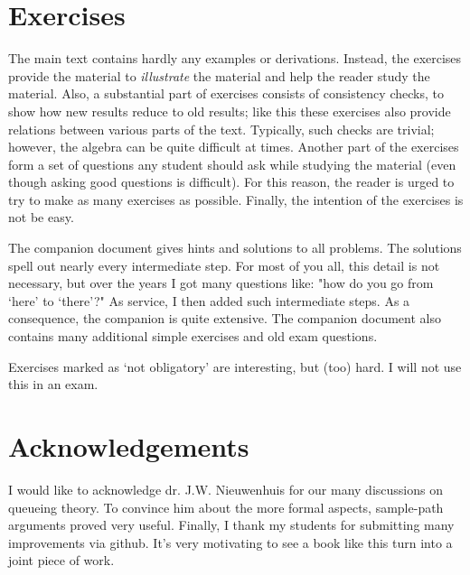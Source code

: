 \section*{Exercises}

The main text contains hardly any examples or derivations.
Instead, the exercises provide the material to \emph{illustrate} the material and help the reader study the material.
Also, a substantial part of exercises consists of consistency checks, to show how new results reduce to old results; like this these exercises also provide relations between various parts of the text.
Typically, such checks are trivial; however, the algebra can be quite difficult at times.
Another part of the exercises form a set of questions any student should ask while studying the material (even though asking good questions is difficult).
For this reason, the reader is urged to try to make as many exercises as possible.
Finally, the intention of  the exercises is not be easy.

The companion document gives hints and solutions to all problems.
The solutions spell out nearly every intermediate step.
For most of you all, this detail is not necessary, but over the years I got many questions like: "how do you go from `here' to `there'?"
As service, I then added such intermediate steps.
As a consequence, the companion is quite extensive.
The companion document also contains many additional simple exercises and old exam questions.

Exercises marked as `not obligatory' are interesting, but (too) hard.
I will not use this in an exam.

\section*{Acknowledgements}

I would like to acknowledge dr.
J.W.
Nieuwenhuis for our many discussions on queueing theory.
To convince him about the more formal aspects, sample-path arguments proved very useful.
Finally, I thank my students for submitting many improvements via github.
It's very motivating to see a book like this turn into a joint piece of work.



